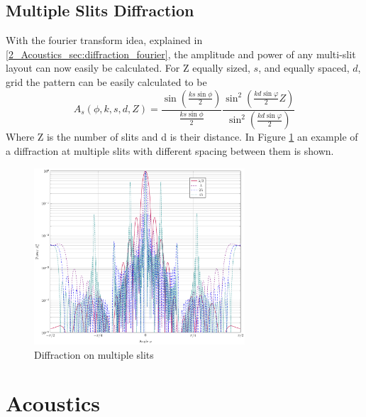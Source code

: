 \subsection{Multiple Slits Diffraction}
With the fourier transform idea, explained in \ref{2_Acoustics_sec:diffraction_fourier}, the amplitude and power of any multi-slit layout can now easily be calculated. For Z equally sized, $s$, and equally spaced, $d$, grid the pattern can be easily calculated to be
\begin{equation}
     A_s(\phi, k, s, d, Z)
     =
     \frac{\sin \left ( \frac{ks \sin \phi}{2}\right )}{ \frac{ks \sin \phi}{2}} \frac{\sin^2\left( \frac{k d \sin{\varphi}}{2}Z\right )}{\sin^2\left( \frac{k d \sin{\varphi}}{2}\right )}
\end{equation}
Where Z is the number of slits and d is their distance. In Figure \ref{6_fig:multiple_diffraction} an example of a diffraction at multiple slits with different spacing between them is shown.
\begin{figure}
    \centering
    \includegraphics[width=0.7\textwidth]{images/2_Preliminaries/Multiple_Slid_Count.pdf}
    \caption{Diffraction on multiple slits}
    \label{6_fig:multiple_diffraction}
\end{figure}

\newpage
\section{Acoustics}
